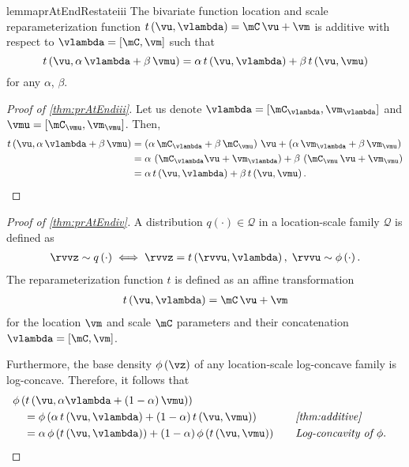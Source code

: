 \begin{restatable}[]{lemma}{prAtEndRestateiii}\label{thm:prAtEndiii}\label {thm:additive} The bivariate function location and scale reparameterization function \( t\left (\vu , \vlambda \right ) = \mC \,\vu + \vm \) is additive with respect to \(\vlambda =\left [\mC , \vm \right ]\) such that \[ t\left (\vu , \alpha \,\vlambda + \beta \,\vmu \right ) = \alpha \,t\left (\vu , \vlambda \right ) + \beta \,t\left (\vu , \vmu \right ) \] for any \(\alpha \), \(\beta \).\end{restatable}
\label{proofsection:prAtEndiii}\begin{proof}[Proof of \autoref{thm:prAtEndiii}]\label{proof:prAtEndiii}Let us denote \(\vlambda =\left [\mC _{\vlambda }, \vm _{\vlambda }\right ]\) and \(\vmu = \left [\mC _{\vmu }, \vm _{\vmu }\right ]\). Then, \begin {alignat}{2} t\left (\vu , \alpha \,\vlambda + \beta \,\vmu \right ) &= \left (\alpha \,\mC _{\vlambda } + \beta \,\mC _{\vmu }\right )\,\vu + \left (\alpha \,\vm _{\vlambda } + \beta \,\vm _{\vmu }\right ) \nonumber \\ &= \alpha \,\left (\mC _{\vlambda }\vu + \vm _{\vlambda }\right ) + \beta \,\left (\mC _{\vmu }\,\vu + \vm _{\vmu }\right ) \nonumber \\ &= \alpha \,t\left (\vu , \vlambda \right ) + \beta \,t\left (\vu , \vmu \right ). \nonumber \end {alignat}\end{proof}
\prAtEndRestateiv*
\label{proofsection:prAtEndiv}\begin{proof}[Proof of \autoref{thm:prAtEndiv}]\label{proof:prAtEndiv}A distribution \(q\left (\cdot \right ) \in \mathcal {Q}\) in a location-scale family \(\mathcal {Q}\) is defined as \begin {align*} \rvvz \sim q\left (\cdot \right ) \iff \rvvz = t\left (\rvvu , \vlambda \right ),\; \rvvu \sim \phi \left (\cdot \right ). \end {align*} The reparameterization function \(t\) is defined as an affine transformation \begin {align*} t\left (\vu , \vlambda \right ) = \mC \,\vu + \vm \end {align*} for the location \(\vm \) and scale \(\mC \) parameters and their concatenation \(\vlambda = \left [\mC , \vm \right ]\). \par Furthermore, the base density \(\phi \left (\vz \right )\) of any location-scale log-concave family is log-concave. Therefore, it follows that \begin {alignat}{2} &\phi \left (t\left (\vu , \alpha \vlambda + (1 - \alpha )\,\vmu \right )\right ) \nonumber \\ &\quad = \phi \left ( \alpha \,t\left (\vu , \vlambda \right ) + (1 - \alpha )\,t\left (\vu , \vmu \right )\right ) &&\quad \text {\textit {\cref {thm:additive}}} \nonumber \\ &\quad = \alpha \,\phi \left (t\left (\vu , \vlambda \right )\right ) + (1 - \alpha )\,\phi \left (t\left (\vu , \vmu \right )\right ) &&\quad \text {\textit {Log-concavity of \(\phi \)}}. \nonumber \end {alignat}\end{proof}
